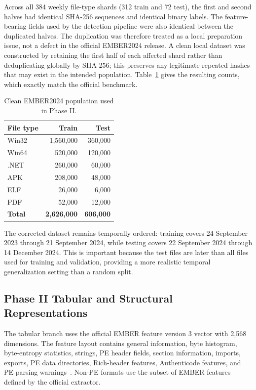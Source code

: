 \documentclass[conference]{IEEEtran}
\begin{document}
Across all 384 weekly file-type shards (312 train and 72 test), the first and second halves had identical SHA-256 sequences and identical binary labels. The feature-bearing fields used by the detection pipeline were also identical between the duplicated halves. The duplication was therefore treated as a local preparation issue, not a defect in the official EMBER2024 release. A clean local dataset was constructed by retaining the first half of each affected shard rather than deduplicating globally by SHA-256; this preserves any legitimate repeated hashes that may exist in the intended population. Table~\ref{tab:clean_counts} gives the resulting counts, which exactly match the official benchmark.

\begin{table}[t]
\centering
\caption{Clean EMBER2024 population used in Phase II.}
\label{tab:clean_counts}
\scriptsize
\renewcommand{\arraystretch}{1.08}
\begin{tabular}{lrr}
\toprule
\textbf{File type} & \textbf{Train} & \textbf{Test} \\
\midrule
Win32 & 1,560,000 & 360,000 \\
Win64 & 520,000 & 120,000 \\
.NET  & 260,000 & 60,000 \\
APK   & 208,000 & 48,000 \\
ELF   & 26,000 & 6,000 \\
PDF   & 52,000 & 12,000 \\
\midrule
\textbf{Total} & \textbf{2,626,000} & \textbf{606,000} \\
\bottomrule
\end{tabular}
\end{table}

The corrected dataset remains temporally ordered: training covers 24 September 2023 through 21 September 2024, while testing covers 22 September 2024 through 14 December 2024. This is important because the test files are later than all files used for training and validation, providing a more realistic temporal generalization setting than a random split.

\subsection{Phase II Tabular and Structural Representations}
The tabular branch uses the official EMBER feature version 3 vector with 2,568 dimensions. The feature layout contains general information, byte histogram, byte-entropy statistics, strings, PE header fields, section information, imports, exports, PE data directories, Rich-header features, Authenticode features, and PE parsing warnings~\cite{JMGPR2024,ember2024github}. Non-PE formats use the subset of EMBER features defined by the official extractor.
\end{document}
